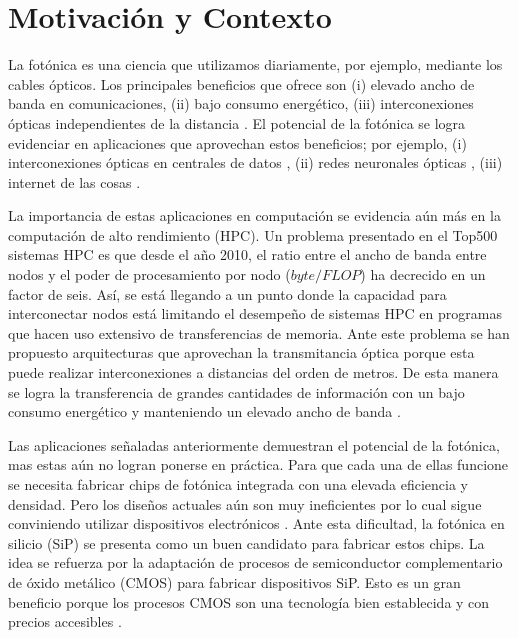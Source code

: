 \chapter{Motivación y Contexto}

La fotónica es una ciencia que utilizamos diariamente, por ejemplo, mediante los cables ópticos.
Los principales beneficios que ofrece son (i) elevado ancho de banda en comunicaciones, (ii) bajo consumo energético, (iii) interconexiones ópticas independientes de la distancia \citep{Glick2018}.
El potencial de la fotónica se logra evidenciar en aplicaciones que aprovechan estos beneficios; por ejemplo,
(i) interconexiones ópticas en centrales de datos \citep{Shen2019}, 
(ii) redes neuronales ópticas \citep{Shen2017}, 
(iii) internet de las cosas \citep{Glick2018}.


La importancia de estas aplicaciones en computación se evidencia aún más en la computación de alto rendimiento (HPC).
Un problema presentado en el Top500 sistemas HPC es que desde el año 2010, el ratio entre el ancho de banda entre nodos y el poder de procesamiento por nodo ($byte / FLOP$) ha decrecido en un factor de seis.
Así, se está llegando a un punto donde la capacidad para interconectar nodos está limitando el desempeño de sistemas HPC en programas que hacen uso extensivo de transferencias de memoria.
Ante este problema se han propuesto arquitecturas que aprovechan la transmitancia óptica porque esta puede realizar interconexiones a distancias del orden de metros. 
De esta manera se logra la transferencia de grandes cantidades de información con un bajo consumo energético y manteniendo un elevado ancho de banda \citep{Shen2019, Anderson2018}.


Las aplicaciones señaladas anteriormente demuestran el potencial de la fotónica, mas estas aún no logran ponerse en práctica. 
Para que cada una de ellas funcione se necesita fabricar chips de fotónica integrada con una elevada eficiencia y densidad.
Pero los diseños actuales aún son muy ineficientes por lo cual sigue conviniendo utilizar dispositivos electrónicos \citep{Glick2018, Vuckovic2019}. 
Ante esta dificultad, la fotónica en silicio (SiP) se presenta como un buen candidato para fabricar estos chips.
La idea se refuerza por la adaptación de procesos de semiconductor complementario de óxido metálico (CMOS) para fabricar dispositivos SiP.
Esto es un gran beneficio porque los procesos CMOS son una tecnología bien establecida y con precios accesibles \citep{Glick2018, Shen2019, LukasChrostowski2010}.


